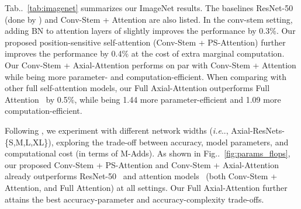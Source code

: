 \documentclass[runningheads]{llncs}
\makeatletter
\DeclareRobustCommand\onedot{\futurelet\@let@token\@onedot}
\def\@onedot{\ifx\@let@token.\else.\null\fi\xspace}
\def\ie{\emph{i.e}\onedot} \def\Ie{\emph{I.e}\onedot}
\newcommand{\figref}[1]{Fig\onedot~\ref{#1}}
\newcommand{\tabref}[1]{Tab\onedot~\ref{#1}}
\makeatother
\begin{document}
\tabref{tab:imagenet} summarizes our ImageNet results. The baselines ResNet-50 \cite{he2016deep} (done by \cite{parmar2019stand}) and Conv-Stem + Attention \cite{parmar2019stand} are also listed. In the conv-stem setting, adding BN to attention layers of \cite{parmar2019stand} slightly improves the performance by 0.3\%. Our proposed position-sensitive self-attention (Conv-Stem + PS-Attention) further improves the performance by 0.4\% at the cost of extra marginal computation. Our Conv-Stem + Axial-Attention performs on par with Conv-Stem + Attention \cite{parmar2019stand} while being more parameter- and computation-efficient. When comparing with other full self-attention models, our Full Axial-Attention outperforms Full Attention~\cite{parmar2019stand} by 0.5\%, while being 1.44 more parameter-efficient and 1.09 more computation-efficient.

Following \cite{parmar2019stand}, we experiment with different network widths (\ie, Axial-ResNets-\{S,M,L,XL\}), exploring the trade-off between accuracy, model parameters, and computational cost (in terms of M-Adds). As shown in \figref{fig:params_flops}, our proposed Conv-Stem + PS-Attention and Conv-Stem + Axial-Attention already outperforms ResNet-50~\cite{he2016deep,parmar2019stand} and attention models~\cite{parmar2019stand} (both Conv-Stem + Attention, and Full Attention) at all settings. Our Full Axial-Attention further attains the best accuracy-parameter and accuracy-complexity trade-offs.
\end{document}
